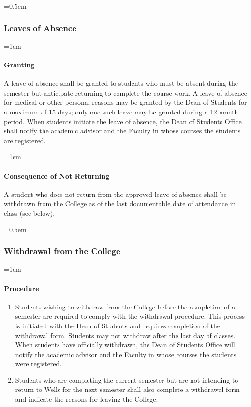 \documentclass{manual}
\let\oldsubsubsection\subsubsection
\renewcommand\subsubsection{\leftskip=0.5em\oldsubsubsection}
\let\oldparagraph\paragraph
\renewcommand\paragraph{\leftskip=1em\oldparagraph}
\begin{document}
\subsubsection{Leaves of Absence}


\paragraph{Granting} 

A leave of absence shall be granted to students who must be absent during the semester but anticipate returning to complete the course work. A leave of absence for medical or other personal reasons may be granted by the Dean of Students for a maximum of 15 days; only one such leave may be granted during a 12-month period. When students initiate the leave of absence, the Dean of Students Office shall notify the academic advisor and the Faculty in whose courses the students are registered.

\paragraph{Consequence of Not Returning}

A student who does not return from the approved leave of absence shall be withdrawn from the College as of the last documentable date of attendance in class (see below).






\subsubsection{Withdrawal from the College}\label{sub:WithdrawlFromTheCollege}


\paragraph{Procedure}
\begin{enumerate}[label=\alph*)]
\item Students wishing to withdraw from the College before the completion of a semester are required to comply with the withdrawal procedure. This process is initiated with the Dean of Students and requires completion of the withdrawal form. Students may not withdraw after the last day of classes. When students have officially withdrawn, the Dean of Students Office will notify the academic advisor and the Faculty in whose courses the students were registered.

\item Students who are completing the current semester but are not intending to return to Wells for the next semester shall also complete a withdrawal form and indicate the reasons for leaving the College.
\end{enumerate}
\end{document}
